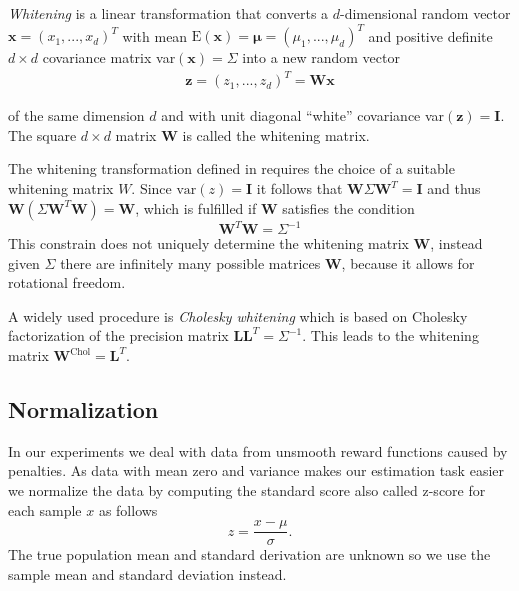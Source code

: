 \textit{Whitening} is a linear transformation that converts a $d$-dimensional
random vector $\mathbf{x} = (x_1,...,x_d)^T$ with mean
$\text{E}(\mathbf{x}) = \mathbf{\mu} = (\mu_1,...,\mu_d)^T$ and
positive definite $d \times d$ covariance matrix
var$(\mathbf{x}) = \Sigma$ into a new random vector
\begin{align}
  \label{whitening}
 \mathbf{z} = (z_1,...,z_d)^T = \mathbf{W}\mathbf{x}
\end{align}

of the same dimension $d$ and with unit diagonal ``white'' covariance
var$(\mathbf{z}) = \mathbf{I}$. The square $d \times d$
matrix $\mathbf{W}$ is called the whitening matrix.

The whitening transformation defined in  requires
the choice of a suitable whitening matrix $W$.
Since $\text{var}(z) = \mathbf{I}$ it follows that
$\mathbf{W}\Sigma \mathbf{W}^T = \mathbf{I}$ and thus
$\mathbf{W}(\Sigma \mathbf{W}^T\mathbf{W}) = \mathbf{W}$, which
is fulfilled if $\mathbf{W}$ satisfies the condition
$$ \mathbf{W}^T \mathbf{W} = \Sigma^{-1} $$
This constrain does not uniquely determine the whitening
matrix $\mathbf{W}$, instead given $\Sigma$ there are infinitely many
possible matrices $\mathbf{W}$, because it allows for rotational freedom.

A widely used procedure is \textit{Cholesky whitening} which is based on
Cholesky factorization of the precision matrix
$\mathbf{L}\mathbf{L}^T = \Sigma^{-1}$. This leads to the whitening
matrix $\mathbf{W}^{\text{Chol}} = \mathbf{L}^T$.

\subsection{Normalization}
\label{sec:normalization}
In our experiments we deal with data from unsmooth reward functions
caused by penalties.
As data with mean zero and variance makes our estimation task easier
we normalize the data by computing the standard score
also called z-score \citep{mendenhall2016statistics}
for each sample $x$ as follows
\begin{equation*}
  \label{eq:norm}
  z = \frac{x - \mu}{\sigma}.
\end{equation*}
The true population mean and standard derivation are unknown
so we use the sample mean and standard deviation instead.

